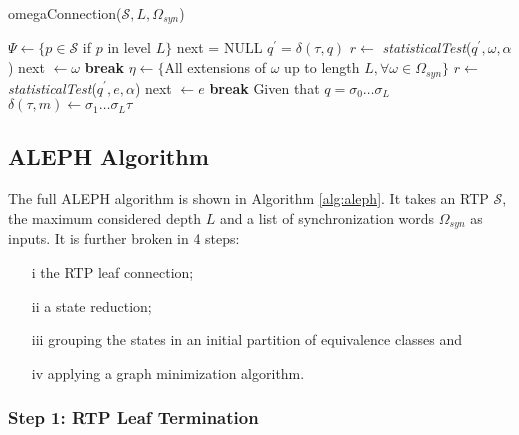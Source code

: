 {  \begin{algorithm}
  \caption{omegaConnection($\mathcal{S}, L, \Omega_{syn}$)\label{alg:omegaterm}}
    \begin{algorithmic}[1]
      	\State $\Psi \gets \{p \in \mathcal{S}$ if $p$ in level $L\}$
      		\State next = NULL
      		\For{$\tau \in \Sigma$}
      			\State $q^{\prime} = \delta(\tau,q)$
      				\State $r \gets$ \textit{statisticalTest}($q^{\prime},\omega, \alpha$)
      					\State next $\gets \omega$
      					\State \textbf{break}
      				\EndIf
      			\EndFor
      				\State $\eta \gets \{$All extensions of $\omega$ up to length $L, \forall \omega \in \Omega_{syn}\}$
      				\State $r \gets$ \textit{statisticalTest}($q^{\prime}, e, \alpha$)
      						\State next $\gets e$
      						\State \textbf{break}
      					\EndIf
      				\EndFor
      			\EndIf
      				\State Given that $q = \sigma_0\ldots\sigma_L$
      			\EndIf
      			\State $\delta(\tau,m) \gets \sigma_1\ldots\sigma_L\tau$
      		\EndFor
      	\EndFor
      \EndProcedure
    \end{algorithmic}
  \end{algorithm}

\subsection{ALEPH Algorithm}

The full ALEPH algorithm is shown in Algorithm \ref{alg:aleph}. It takes an RTP $\mathcal{S}$, the maximum considered depth $L$ and a list of synchronization words $\Omega_{syn}$ as inputs. It is further broken in 4 steps: 
\begin{itemize}
\item[i] the RTP leaf connection;
\item[ii] a state reduction;
\item[iii] grouping the states in an initial partition of equivalence classes and
\item[iv] applying a graph minimization algorithm.
\end{itemize}

\subsubsection{Step 1: RTP Leaf Termination}

}
